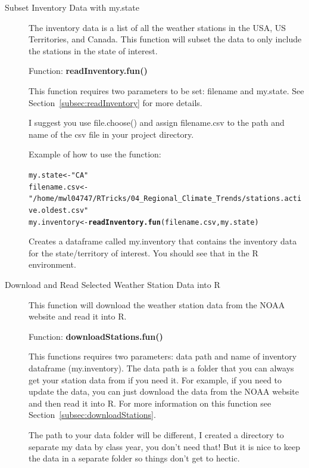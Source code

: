 \documentclass{article}\usepackage[]{graphicx}\usepackage[dvipsnames]{xcolor}
\makeatletter
\newcommand{\hlstr}[1]{\textcolor[rgb]{0.192,0.494,0.8}{#1}}%
\newcommand{\hlstd}[1]{\textcolor[rgb]{0.345,0.345,0.345}{#1}}%
\newcommand{\hlkwb}[1]{\textcolor[rgb]{0.69,0.353,0.396}{#1}}%
\newcommand{\hlkwd}[1]{\textcolor[rgb]{0.737,0.353,0.396}{\textbf{#1}}}%
\newenvironment{kframe}{%
 \def\at@end@of@kframe{}%
 \ifinner\ifhmode%
  \def\at@end@of@kframe{\end{minipage}}%
  \begin{minipage}{\columnwidth}%
 \fi\fi%
 \def\FrameCommand##1{\hskip\@totalleftmargin \hskip-\fboxsep
 \colorbox{shadecolor}{##1}\hskip-\fboxsep
     \hskip-\linewidth \hskip-\@totalleftmargin \hskip\columnwidth}%
 \MakeFramed {\advance\hsize-\width
   \@totalleftmargin\z@ \linewidth\hsize
   \@setminipage}}%
 {\par\unskip\endMakeFramed%
 \at@end@of@kframe}
\newenvironment{knitrout}{}{} %
\makeatother
\begin{document}
\begin{description}

\item[Subset Inventory Data with my.state]  The inventory data is a list of all the weather stations in the USA, US Territories, and Canada. This function will subset the data to only include the stations in the state of interest.

\noindent Function: \textbf{readInventory.fun()}

This function requires two parameters to be set: filename and my.state. See Section~\ref{subsec:readInventory} for more details.

I suggest you use file.choose() and assign filename.csv to the path and name of the csv file in your project directory.  

Example of how to use the function:

\begin{knitrout}
\color{fgcolor}\begin{kframe}
\begin{alltt}
\hlstd{my.state} \hlkwb{<-} \hlstr{"CA"}
\hlstd{filename.csv} \hlkwb{<-} \hlstr{"/home/mwl04747/RTricks/04_Regional_Climate_Trends/stations.active.oldest.csv"}
\hlstd{my.inventory} \hlkwb{<-} \hlkwd{readInventory.fun}\hlstd{(filename.csv, my.state)}
\end{alltt}
\end{kframe}
\end{knitrout}

Creates a dataframe called my.inventory that contains the inventory data for the state/territory of interest. You should see that in the R environment.

\item[Download and Read Selected Weather Station Data into R] This function will download the weather station data from the NOAA website and read it into R.

\noindent Function: \textbf{downloadStations.fun()} 

This functions requires two parameters: data path and name of inventory dataframe (my.inventory). The data path is a folder that you can always get your station data from if you need it. For example, if you need to update the data, you can just download the data from the NOAA website and then read it into R. For more information on this function see Section~\ref{subsec:downloadStations}.

The path to your data folder will be different, I created a directory to separate my data by class year, you don't need that! But it is nice to keep the data in a separate folder so things don't get to hectic.


\end{description}
\end{document}
